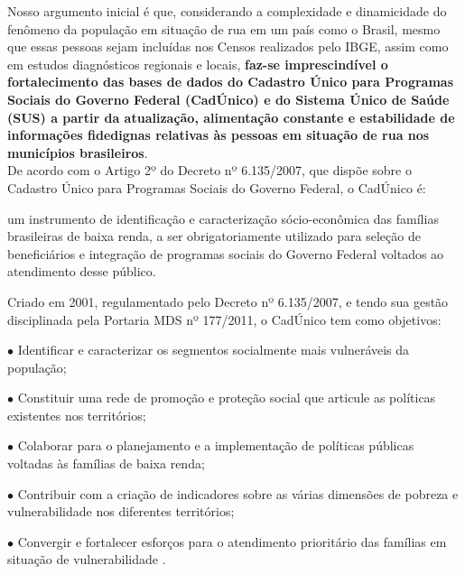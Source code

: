 \documentclass[12pt]{article}
\begin{document}
Nosso argumento inicial é que, considerando a complexidade e dinamicidade do fenômeno da população em situação de rua em um país como o Brasil, mesmo que essas pessoas sejam incluídas nos Censos realizados pelo IBGE, assim como em estudos diagnósticos regionais e locais, \textbf{faz-se imprescindível o fortalecimento das bases de dados do Cadastro Único para Programas Sociais do Governo Federal (CadÚnico) e do Sistema Único de Saúde (SUS) a partir da atualização, alimentação constante e estabilidade de informações fidedignas relativas às pessoas em situação de rua nos municípios brasileiros}.\\

De acordo com o Artigo 2º do Decreto nº 6.135/2007, que dispõe sobre o Cadastro Único para Programas Sociais do Governo Federal, o CadÚnico é:

\begin{trivlist}\leftskip=2.5cm
\item um instrumento de identificação e caracterização sócio-econômica das famílias brasileiras de baixa renda, a ser obrigatoriamente utilizado para seleção de beneficiários e integração de programas sociais do Governo Federal voltados ao atendimento desse público.
\end{trivlist}

Criado em 2001, regulamentado pelo Decreto nº 6.135/2007, e tendo sua gestão disciplinada pela Portaria MDS nº 177/2011, o CadÚnico tem como objetivos:

\begin{trivlist}\leftskip=2.5cm
\item {$\bullet$ Identificar e caracterizar os segmentos socialmente mais vulneráveis da população;}
\item {$\bullet$ Constituir uma rede de promoção e proteção social que articule as políticas existentes nos territórios;}
\item {$\bullet$ Colaborar para o planejamento e a implementação de políticas públicas voltadas às famílias de baixa renda;}
\item {$\bullet$ Contribuir com a criação de indicadores sobre as várias dimensões de pobreza e vulnerabilidade nos diferentes territórios;}
\item {$\bullet$ Convergir e fortalecer esforços para o atendimento prioritário das famílias em situação de vulnerabilidade \citep{cadunico}.}
\end{trivlist}
\end{document}
